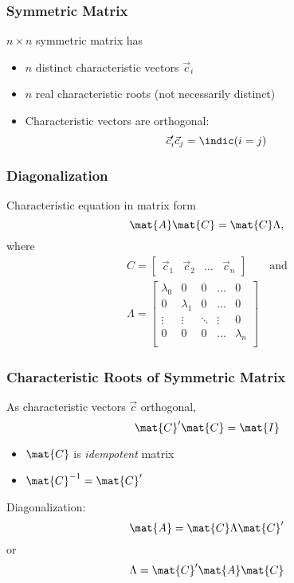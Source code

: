 \documentclass[mathserif, xcolor=table, svgnames]{beamer}
\begin{document}
\begin{frame}
  \frametitle{Symmetric Matrix}
  $n\times n$ symmetric matrix has
  \begin{itemize}
  \item $n$ distinct characteristic vectors $\vec{c}_{i}$
  \item $n$ real characteristic roots (not necessarily distinct)
  \item Characteristic vectors are orthogonal:
    \begin{equation*}
      \vec{c}_{i}' \vec{c}_{j} = \indic(i=j)
    \end{equation*}
  \end{itemize}
\end{frame}

\begin{frame}
  \frametitle{Diagonalization}
  Characteristic equation in matrix form
  \begin{equation*}
    \mat{A} \mat{C} = \mat{C} \Lambda,
  \end{equation*}
  where
  \begin{multline*}
    C = 
    \begin{bmatrix}
      \vec{c}_{1} & \vec{c}_{2} & \hdots & \vec{c}_{n}
    \end{bmatrix}
      \qquad\text{and}\\
      \Lambda =
      \begin{bmatrix}
        \lambda_{0} & 0 & 0 & \hdots & 0\\
        0 & \lambda_{1} & 0 & \hdots & 0\\
        \vdots & \vdots & \ddots & \vdots & 0\\
        0 & 0 & 0 & \hdots & \lambda_{n}\\
      \end{bmatrix}
  \end{multline*}
\end{frame}

\begin{frame}
  \frametitle{Characteristic Roots of Symmetric Matrix}
  As characteristic vectors $\vec{c}$ orthogonal,
  \begin{equation*}
    \mat{C}' \mat{C} = \mat{I}
  \end{equation*}
  \begin{itemize}
  \item $\mat{C}$ is \emph{idempotent} matrix
  \item $\mat{C}^{-1} = \mat{C}'$
  \end{itemize}
  Diagonalization:
  \begin{equation*}
    \mat{A} = \mat{C} \Lambda  \mat{C}'
  \end{equation*}
  or
  \begin{equation*}
    \Lambda = \mat{C}' \mat{A} \mat{C}
  \end{equation*}
\end{frame}
\end{document}
